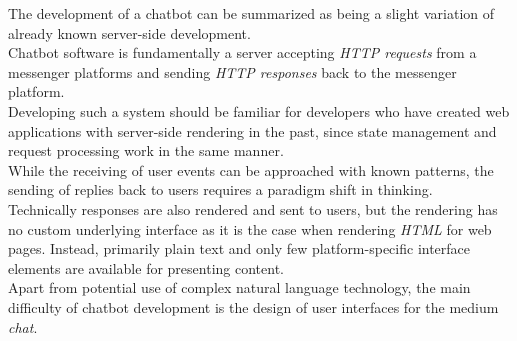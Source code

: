 The development of a chatbot can be summarized as being a slight variation of already known server-side development.
\\
Chatbot software is fundamentally a server accepting \emph{HTTP requests} from a messenger platforms and sending \emph{HTTP responses} back to the messenger platform.
\\
Developing such a system should be familiar for developers who have created web applications with server-side rendering in the past,
since state management and request processing work in the same manner.
\\
While the receiving of user events can be approached with known patterns, the sending of replies back to users requires a paradigm shift in thinking.
\\
Technically responses are also rendered and sent to users,
but the rendering has no custom underlying interface as it is the case when rendering \emph{HTML} for web pages.
Instead, primarily plain text and only few platform-specific interface elements are available for presenting content.
\\

Apart from potential use of complex natural language technology,
the main difficulty of chatbot development is the design of user interfaces for the medium \emph{chat}.
